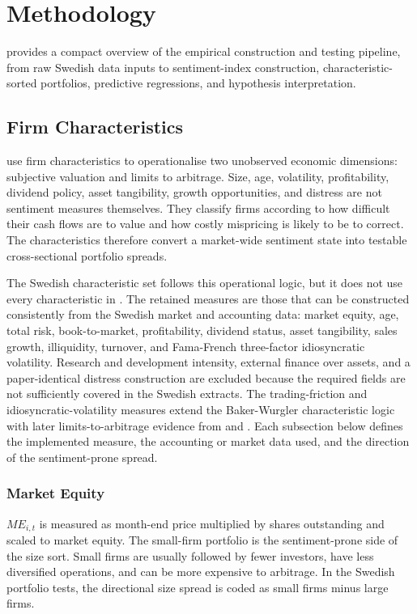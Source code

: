 \documentclass[11pt]{article}
\newcommand{\var}[1]{\ensuremath{#1}}
\begin{document}
\section{Methodology}
 provides a compact overview of the empirical construction and testing pipeline, from raw Swedish data inputs to sentiment-index construction, characteristic-sorted portfolios, predictive regressions, and hypothesis interpretation.

\subsection{Firm Characteristics}
\citet{baker2006sentiment} use firm characteristics to operationalise two unobserved economic dimensions: subjective valuation and limits to arbitrage. Size, age, volatility, profitability, dividend policy, asset tangibility, growth opportunities, and distress are not sentiment measures themselves. They classify firms according to how difficult their cash flows are to value and how costly mispricing is likely to be to correct. The characteristics therefore convert a market-wide sentiment state into testable cross-sectional portfolio spreads.

The Swedish characteristic set follows this operational logic, but it does not use every characteristic in \citet{baker2006sentiment}. The retained measures are those that can be constructed consistently from the Swedish market and accounting data: market equity, age, total risk, book-to-market, profitability, dividend status, asset tangibility, sales growth, illiquidity, turnover, and Fama-French three-factor idiosyncratic volatility. Research and development intensity, external finance over assets, and a paper-identical distress construction are excluded because the required fields are not sufficiently covered in the Swedish extracts. The trading-friction and idiosyncratic-volatility measures extend the Baker-Wurgler characteristic logic with later limits-to-arbitrage evidence from \citet{stambaugh2012short} and \citet{stambaugh2015ivol}. Each subsection below defines the implemented measure, the accounting or market data used, and the direction of the sentiment-prone spread.

\subsubsection{Market Equity}
\var{ME_{i,t}} is measured as month-end price multiplied by shares outstanding and scaled to market equity. The small-firm portfolio is the sentiment-prone side of the size sort. Small firms are usually followed by fewer investors, have less diversified operations, and can be more expensive to arbitrage. In the Swedish portfolio tests, the directional size spread is coded as small firms minus large firms.
\end{document}
